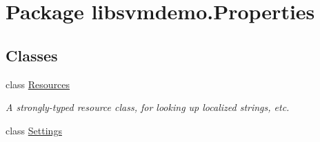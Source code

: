 \hypertarget{namespacelibsvmdemo_1_1_properties}{
\section{Package libsvmdemo.Properties}
\label{namespacelibsvmdemo_1_1_properties}
}
\subsection*{Classes}
\begin{DoxyCompactItemize}
\item 
class \hyperlink{classlibsvmdemo_1_1_properties_1_1_resources}{Resources}
\begin{DoxyCompactList}\small\item\em A strongly-\/typed resource class, for looking up localized strings, etc. \item\end{DoxyCompactList}\item 
class \hyperlink{classlibsvmdemo_1_1_properties_1_1_settings}{Settings}
\end{DoxyCompactItemize}
